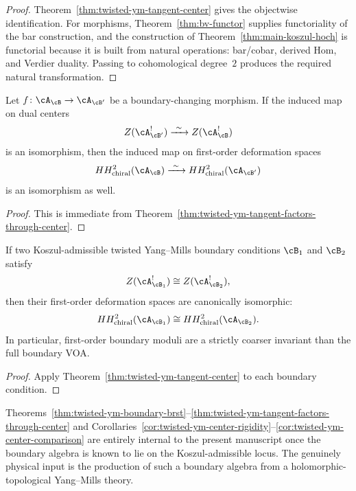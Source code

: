 \begin{proof}
Theorem~\ref{thm:twisted-ym-tangent-center} gives the objectwise identification.
For morphisms, Theorem~\ref{thm:bv-functor} supplies functoriality of the bar construction,
and the construction of Theorem~\ref{thm:main-koszul-hoch} is functorial because it is built
from natural operations: bar/cobar, derived \(\mathrm{Hom}\), and Verdier duality.  Passing to
cohomological degree~$2$ produces the required natural transformation.
\end{proof}

\begin{corollary}
\label{cor:twisted-ym-interface-invariance}
Let $f \colon \cA_{\cB} \to \cA_{\cB'}$ be a boundary-changing morphism.
If the induced map on dual centers
\[
Z(\cA_{\cB'}^!) \xrightarrow{\ \sim\ } Z(\cA_{\cB}^!)
\]
is an isomorphism, then the induced map on first-order deformation spaces
\[
HH^2_{\mathrm{chiral}}(\cA_{\cB}) \xrightarrow{\ \sim\ } HH^2_{\mathrm{chiral}}(\cA_{\cB'})
\]
is an isomorphism as well.
\end{corollary}

\begin{proof}
This is immediate from Theorem~\ref{thm:twisted-ym-tangent-factors-through-center}.
\end{proof}

\begin{corollary}
\label{cor:twisted-ym-center-comparison}
If two Koszul-admissible twisted Yang--Mills boundary conditions $\cB_1$ and $\cB_2$ satisfy
\[
Z(\cA_{\cB_1}^!) \cong Z(\cA_{\cB_2}^!),
\]
then their first-order deformation spaces are canonically isomorphic:
\[
HH^2_{\mathrm{chiral}}(\cA_{\cB_1}) \cong HH^2_{\mathrm{chiral}}(\cA_{\cB_2}).
\]
In particular, first-order boundary moduli are a strictly coarser invariant than the full
boundary VOA.
\end{corollary}

\begin{proof}
Apply Theorem~\ref{thm:twisted-ym-tangent-center} to each boundary condition.
\end{proof}

\begin{remark}
\label{rem:twisted-ym-math-vs-physics}
Theorems~\ref{thm:twisted-ym-boundary-brst}--\ref{thm:twisted-ym-tangent-factors-through-center}
and Corollaries~\ref{cor:twisted-ym-center-rigidity}--\ref{cor:twisted-ym-center-comparison}
are entirely internal to the present manuscript once the boundary algebra is known to lie on
the Koszul-admissible locus.  The genuinely physical input is the production of such a
boundary algebra from a holomorphic-topological Yang--Mills theory.
\end{remark}

